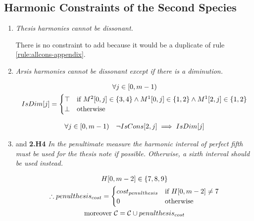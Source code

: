 \subsection*{Harmonic Constraints of the Second Species}
\begin{enumerate}[wide, label=\bfseries 2.H\arabic*]
\item\label{rule:consthesis}{ \textit{Thesis harmonies cannot be dissonant.}}

There is no constraint to add because it would be a duplicate of rule \ref{rule:allcons-appendix}.

\item\label{rule:arsisdim}{\textit{Arsis harmonies cannot be dissonant except if there is a diminution.}}

\begin{equation}
    \begin{gathered}
        \forall j \in [0, m-1)\\
        IsDim[j] = \begin{cases}
            \top & \text{if } M^2[0, j] \in \{3, 4\} \land M^1[0, j] \in \{1, 2\} \land M^1[2, j] \in \{1, 2\}\\
            \bot & \text{otherwise}
        \end{cases}
    \end{gathered}
\end{equation}

\begin{equation}
    \begin{gathered}
        \forall j \in [0, m-1) \quad
        \lnot IsCons[2, j] \implies IsDim[j]
    \end{gathered}
\end{equation}

\item\label{rule:penult2nd} \label{rule:penultexception}{and \textbf{2.H4} \textit{In the penultimate measure the harmonic interval of perfect fifth must be used for the thesis note if possible. Otherwise, a sixth interval should be used instead.}}
\addtocounter{enumi}{1}

\begin{equation}
    \begin{gathered}
        H[0, m-2] \in \{7, 8, 9\}\\
        \therefore penulthesis_{cost} = \begin{cases}
            cost_{penulthesis} & \text{if } H[0, m-2] \neq 7\\
            0 & \text{otherwise}
        \end{cases}\\
        \text{moreover } \mathcal{C} = \mathcal{C} \cup penulthesis_{cost}
    \end{gathered}
\end{equation}


\end{enumerate}
